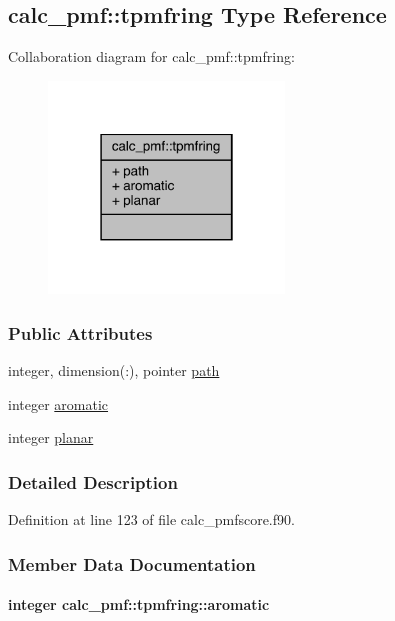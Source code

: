 \hypertarget{structcalc__pmf_1_1tpmfring}{\subsection{calc\-\_\-pmf\-:\-:tpmfring Type Reference}
\label{structcalc__pmf_1_1tpmfring}
}


Collaboration diagram for calc\-\_\-pmf\-:\-:tpmfring\-:
\nopagebreak
\begin{figure}[H]
\begin{center}
\leavevmode
\includegraphics[width=178pt]{structcalc__pmf_1_1tpmfring__coll__graph}
\end{center}
\end{figure}
\subsubsection*{Public Attributes}
\begin{DoxyCompactItemize}
\item 
integer, dimension(\-:), pointer \hyperlink{structcalc__pmf_1_1tpmfring_a59898428901298bc367bfa1d5f9f1213}{path}
\item 
integer \hyperlink{structcalc__pmf_1_1tpmfring_a8b0c416e6664b9ffdde4ba96b8c00b22}{aromatic}
\item 
integer \hyperlink{structcalc__pmf_1_1tpmfring_a2daea6db79515a281dc692fafce9a7c8}{planar}
\end{DoxyCompactItemize}


\subsubsection{Detailed Description}


Definition at line 123 of file calc\-\_\-pmfscore.\-f90.



\subsubsection{Member Data Documentation}
\hypertarget{structcalc__pmf_1_1tpmfring_a8b0c416e6664b9ffdde4ba96b8c00b22}{
\paragraph[{aromatic}]{\setlength{\rightskip}{0pt plus 5cm}integer calc\-\_\-pmf\-::tpmfring\-::aromatic}}\label{structcalc__pmf_1_1tpmfring_a8b0c416e6664b9ffdde4ba96b8c00b22}


